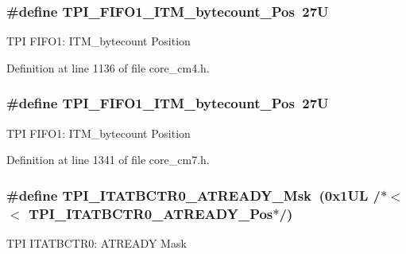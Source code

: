 \subsubsection[{\texorpdfstring{T\+P\+I\+\_\+\+F\+I\+F\+O1\+\_\+\+I\+T\+M\+\_\+bytecount\+\_\+\+Pos}{TPI_FIFO1_ITM_bytecount_Pos}}]{\setlength{\rightskip}{0pt plus 5cm}\#define T\+P\+I\+\_\+\+F\+I\+F\+O1\+\_\+\+I\+T\+M\+\_\+bytecount\+\_\+\+Pos~27U}\hypertarget{group___c_m_s_i_s___t_p_i_gaa22ebf7c86e4f4b2c98cfd0b5981375a}{}\label{group___c_m_s_i_s___t_p_i_gaa22ebf7c86e4f4b2c98cfd0b5981375a}
T\+PI F\+I\+F\+O1\+: I\+T\+M\+\_\+bytecount Position 

Definition at line 1136 of file core\+\_\+cm4.\+h.

\subsubsection[{\texorpdfstring{T\+P\+I\+\_\+\+F\+I\+F\+O1\+\_\+\+I\+T\+M\+\_\+bytecount\+\_\+\+Pos}{TPI_FIFO1_ITM_bytecount_Pos}}]{\setlength{\rightskip}{0pt plus 5cm}\#define T\+P\+I\+\_\+\+F\+I\+F\+O1\+\_\+\+I\+T\+M\+\_\+bytecount\+\_\+\+Pos~27U}\hypertarget{group___c_m_s_i_s___t_p_i_gaa22ebf7c86e4f4b2c98cfd0b5981375a}{}\label{group___c_m_s_i_s___t_p_i_gaa22ebf7c86e4f4b2c98cfd0b5981375a}
T\+PI F\+I\+F\+O1\+: I\+T\+M\+\_\+bytecount Position 

Definition at line 1341 of file core\+\_\+cm7.\+h.

\subsubsection[{\texorpdfstring{T\+P\+I\+\_\+\+I\+T\+A\+T\+B\+C\+T\+R0\+\_\+\+A\+T\+R\+E\+A\+D\+Y\+\_\+\+Msk}{TPI_ITATBCTR0_ATREADY_Msk}}]{\setlength{\rightskip}{0pt plus 5cm}\#define T\+P\+I\+\_\+\+I\+T\+A\+T\+B\+C\+T\+R0\+\_\+\+A\+T\+R\+E\+A\+D\+Y\+\_\+\+Msk~(0x1\+U\+L /$\ast$$<$$<$ T\+P\+I\+\_\+\+I\+T\+A\+T\+B\+C\+T\+R0\+\_\+\+A\+T\+R\+E\+A\+D\+Y\+\_\+\+Pos$\ast$/)}\hypertarget{group___c_m_s_i_s___t_p_i_gaee320b3c60f9575aa96a8742c4ff9356}{}\label{group___c_m_s_i_s___t_p_i_gaee320b3c60f9575aa96a8742c4ff9356}
T\+PI I\+T\+A\+T\+B\+C\+T\+R0\+: A\+T\+R\+E\+A\+DY Mask 

